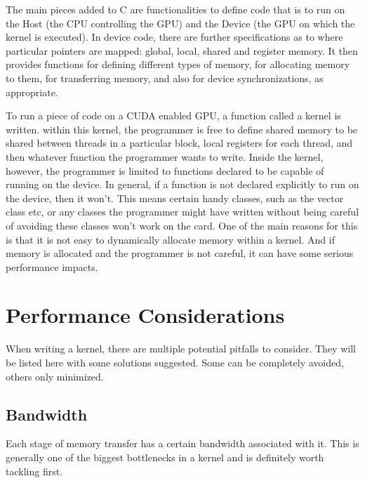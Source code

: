\documentclass[a4paper,12pt]{report}
\begin{document}
The main pieces added to C are functionalities to define code that is to run on the Host (the CPU controlling the GPU) and the Device (the GPU on which the kernel is executed).
In device code, there are further specifications as to where particular pointers are mapped: global, local, shared and register memory.
It then provides functions for defining different types of memory, for allocating memory to them, for transferring memory, and also for device synchronizations, as appropriate.

To run a piece of code on a CUDA enabled GPU, a function called a kernel is written.
within this kernel, the programmer is free to define shared memory to be shared between threads in a particular block, local registers for each thread, and then whatever function the programmer wants to write.
Inside the kernel, however, the programmer is limited to functions declared to be capable of running on the device.
In general, if a function is not declared explicitly to run on the device, then it won't.
This means certain handy classes, such as the vector class etc, or any classes the programmer might have written without being careful of avoiding these classes won't work on the card.
One of the main reasons for this is that it is not easy to dynamically allocate memory within a kernel.
And if memory is allocated and the programmer is not careful, it can have some serious performance impacts.


\section{Performance Considerations}
When writing a kernel, there are multiple potential pitfalls to consider.
They will be listed here with some solutions suggested.
Some can be completely avoided, others only minimized.




\subsection{Bandwidth}\label{subsec:bandwidth}
Each stage of memory transfer has a certain bandwidth associated with it.
This is generally one of the biggest bottlenecks in a kernel and is definitely worth tackling first.
\end{document}
